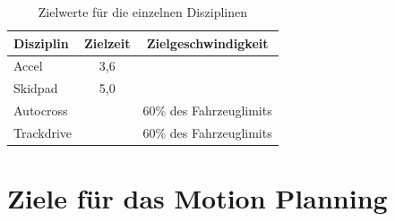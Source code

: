 \medskip
\medskip

\begin{table}[H]
	\centering
	\begin{tabular}{|l|c|c|}
		\hline
		Disziplin & Zielzeit & Zielgeschwindigkeit \\
		\hline
		Accel & 3,6 &  \\
		Skidpad & 5,0 &  \\
		Autocross &  & 60\% des Fahrzeuglimits \\
		Trackdrive &  & 60\% des Fahrzeuglimits \\
		\hline
	\end{tabular}
    \caption{Zielwerte für die einzelnen Disziplinen}
    \label{tab:goals}
\end{table}

\section{Ziele für das Motion Planning}